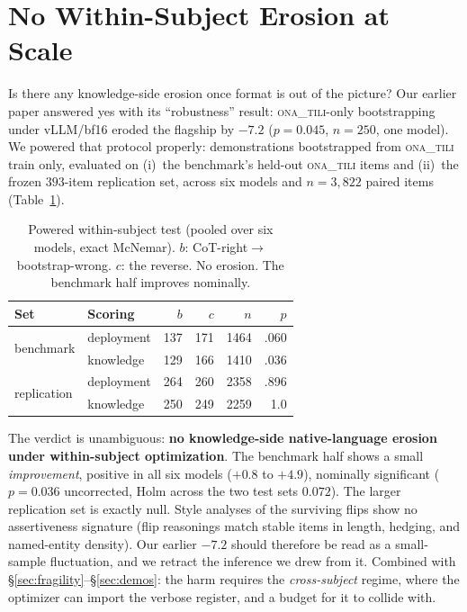 \documentclass[11pt]{article}
\newcommand{\ona}{\textsc{ona\_tili}}
\begin{document}
\section{No Within-Subject Erosion at Scale}\label{sec:powered}

Is there any knowledge-side erosion once format is out of the picture? Our earlier
paper answered yes with its ``robustness'' result: \ona{}-only bootstrapping under
vLLM/bf16 eroded the flagship by $-7.2$ ($p{=}0.045$, $n{=}250$, one model). We
powered that protocol properly: demonstrations bootstrapped from \ona{} train only,
evaluated on (i)~the benchmark's held-out \ona{} items and (ii)~the frozen $393$-item
replication set, across six models and $n{=}3{,}822$ paired items
(Table~\ref{tab:powered}).

\begin{table}[t]\centering\small
\caption{Powered within-subject test (pooled over six models, exact McNemar).
$b$: CoT-right${\to}$bootstrap-wrong. $c$: the reverse. No erosion. The benchmark
half improves nominally.}
\label{tab:powered}
\setlength{\tabcolsep}{4pt}
\begin{tabular}{llrrrr}
\toprule
Set & Scoring & $b$ & $c$ & $n$ & $p$ \\
\midrule
\multirow{2}{*}{benchmark} & deployment & 137 & 171 & 1464 & .060 \\
 & knowledge & 129 & 166 & 1410 & .036 \\
\multirow{2}{*}{replication} & deployment & 264 & 260 & 2358 & .896 \\
 & knowledge & 250 & 249 & 2259 & 1.0 \\
\bottomrule
\end{tabular}
\end{table}

The verdict is unambiguous: \textbf{no knowledge-side native-language erosion under
within-subject optimization}. The benchmark half shows a small \emph{improvement},
positive in all six models ($+0.8$ to $+4.9$), nominally significant
($p{=}0.036$ uncorrected, Holm across the two test sets $0.072$). The larger
replication set is exactly null. Style analyses of the surviving flips show no
assertiveness signature (flip reasonings match stable items in length, hedging, and
named-entity density). Our earlier $-7.2$ should therefore be read as a small-sample
fluctuation, and we retract the inference we drew from it. Combined with
\S\ref{sec:fragility}--\S\ref{sec:demos}: the harm requires the \emph{cross-subject}
regime, where the optimizer can import the verbose register, and a budget for it to
collide with.
\end{document}
